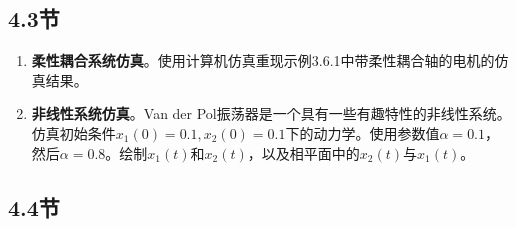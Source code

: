 \documentclass[UTF8]{ctexart}
\theoremstyle{definition}
\begin{document}
\subsection*{4.3节}
\begin{enumerate}[label=4.3--\arabic*, resume]
\item \textbf{柔性耦合系统仿真}。使用计算机仿真重现示例3.6.1中带柔性耦合轴的电机的仿真结果。

\item \textbf{非线性系统仿真}。Van der Pol振荡器是一个具有一些有趣特性的非线性系统。仿真初始条件$x_1(0)=0.1, x_2(0)=0.1$下的动力学。使用参数值$\alpha=0.1$，然后$\alpha=0.8$。绘制$x_1(t)$和$x_2(t)$，以及相平面中的$x_2(t)$与$x_1(t)$。
\end{enumerate}

\subsection*{4.4节}
\end{document}
